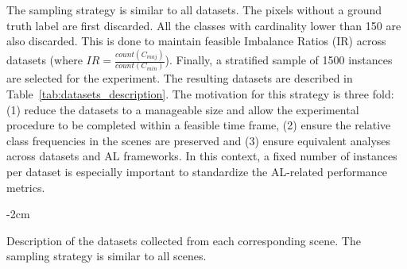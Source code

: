 \documentclass[remotesensing,article,submit,moreauthors,pdftex]{Definitions/mdpi}
\begin{document}
\begin{paracol}{2}
\linenumbers
\switchcolumn

The sampling strategy is similar to all datasets. The pixels without a ground
truth label are first discarded. All the classes with cardinality lower than
150 are also discarded. This is done to maintain feasible Imbalance Ratios (IR)
across datasets (where $IR = \frac{count(C_{maj})}{count(C_{min})}$). Finally,
a stratified sample of 1500 instances are selected for the experiment. The
resulting datasets are described in Table~\ref{tab:datasets_description}. The
motivation for this strategy is three fold: (1) reduce the datasets to a
manageable size and allow the experimental procedure to be completed within a
feasible time frame, (2) ensure the relative class frequencies in the scenes
are preserved and (3) ensure equivalent analyses across datasets and AL
frameworks. In this context, a fixed number of instances per dataset is
especially important to standardize the AL-related performance metrics.

\end{paracol}
\begin{table}
    \centering
    \addtolength{\leftskip} {-2cm}
    \addtolength{\rightskip}{-2cm}
    \caption{\label{tab:datasets_description}
        Description of the datasets collected from each corresponding scene.
        The sampling strategy is similar to all scenes.
    }
\end{table}
\end{document}
